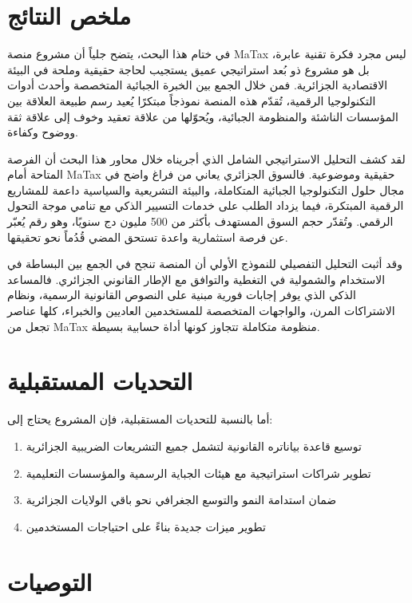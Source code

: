 \documentclass[12pt, a4paper, twoside]{report}
\begin{document}
\section{ملخص النتائج}

في ختام هذا البحث، يتضح جلياً أن مشروع منصة MaTax ليس مجرد فكرة تقنية عابرة، بل هو مشروع ذو بُعد استراتيجي عميق يستجيب لحاجة حقيقية وملحة في البيئة الاقتصادية الجزائرية. فمن خلال الجمع بين الخبرة الجبائية المتخصصة وأحدث أدوات التكنولوجيا الرقمية، تُقدّم هذه المنصة نموذجاً مبتكرًا يُعيد رسم طبيعة العلاقة بين المؤسسات الناشئة والمنظومة الجبائية، ويُحوّلها من علاقة تعقيد وخوف إلى علاقة ثقة ووضوح وكفاءة.

لقد كشف التحليل الاستراتيجي الشامل الذي أجريناه خلال محاور هذا البحث أن الفرصة المتاحة أمام MaTax حقيقية وموضوعية. فالسوق الجزائري يعاني من فراغ واضح في مجال حلول التكنولوجيا الجبائية المتكاملة، والبيئة التشريعية والسياسية داعمة للمشاريع الرقمية المبتكرة، فيما يزداد الطلب على خدمات التسيير الذكي مع تنامي موجة التحول الرقمي. وتُقدّر حجم السوق المستهدف بأكثر من 500 مليون دج سنويًا، وهو رقم يُعبّر عن فرصة استثمارية واعدة تستحق المضي قُدُماً نحو تحقيقها.

وقد أثبت التحليل التفصيلي للنموذج الأولي أن المنصة تنجح في الجمع بين البساطة في الاستخدام والشمولية في التغطية والتوافق مع الإطار القانوني الجزائري. فالمساعد الذكي الذي يوفر إجابات فورية مبنية على النصوص القانونية الرسمية، ونظام الاشتراكات المرن، والواجهات المتخصصة للمستخدمين العاديين والخبراء، كلها عناصر تجعل من MaTax منظومة متكاملة تتجاوز كونها أداة حسابية بسيطة.

\section{التحديات المستقبلية}

أما بالنسبة للتحديات المستقبلية، فإن المشروع يحتاج إلى:
\begin{enumerate}
    \item توسيع قاعدة بياناتره القانونية لتشمل جميع التشريعات الضريبية الجزائرية
    \item تطوير شراكات استراتيجية مع هيئات الجباية الرسمية والمؤسسات التعليمية
    \item ضمان استدامة النمو والتوسع الجغرافي نحو باقي الولايات الجزائرية
    \item تطوير ميزات جديدة بناءً على احتياجات المستخدمين
\end{enumerate}

\section{التوصيات}
\end{document}
